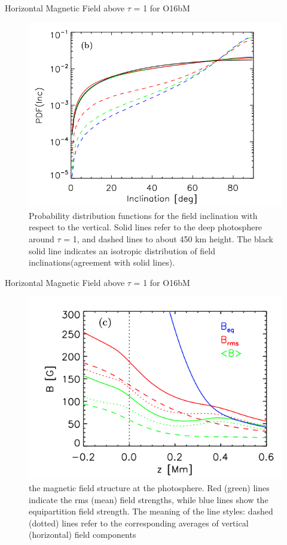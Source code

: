 \documentclass{beamer}
\begin{document}
\begin{frame}{Horizontal Magnetic Field above $\tau$ = 1 for O16bM}

\begin{figure}[H]
 \centering
 \includegraphics[scale=0.3]{img382.png}
	\caption{ Probability distribution functions for the field inclination with respect to the vertical. Solid lines refer to
the deep photosphere around $\tau$ = 1, and dashed lines to about 450 km height. 
The black solid line indicates an isotropic distribution of field inclinations(agreement with solid lines).}
\end{figure}

\end{frame}

\begin{frame}{Horizontal Magnetic Field above $\tau$ = 1 for O16bM}

\begin{figure}[H]
 \centering
 \includegraphics[scale=0.3]{img383.png}
	\caption{the magnetic field structure at the photosphere. Red (green) lines indicate
the rms (mean) field strengths, while blue lines show the equipartition field strength. The meaning of the line styles: dashed
(dotted) lines refer to the corresponding averages of vertical (horizontal) field components}
\end{figure}

\end{frame}
\end{document}

